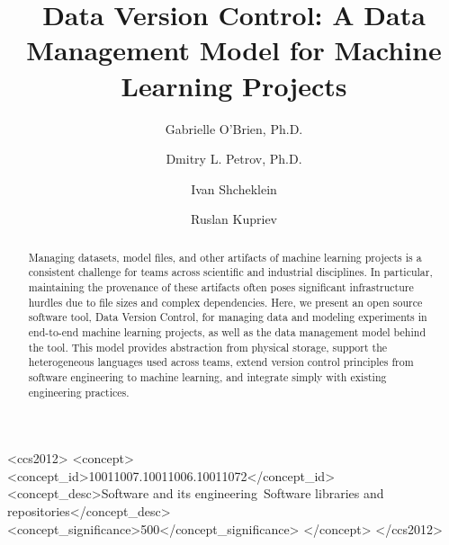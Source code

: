 \documentclass[10pt,sigconf, authordraft]{acmart}
\begin{document}
\title{Data Version Control: A Data Management Model for Machine Learning Projects}

\author{Gabrielle O'Brien, Ph.D.}

\author{Dmitry L. Petrov, Ph.D.}

\author{Ivan Shcheklein}

\author{Ruslan Kupriev}



\renewcommand{\shortauthors}{O'Brien et al.}

\begin{abstract}
    Managing datasets, model files, and other artifacts of machine learning projects is a consistent challenge for teams across scientific and industrial disciplines. In particular, maintaining the provenance of these artifacts often poses significant infrastructure hurdles due to file sizes and complex dependencies. Here, we present an open source software tool, Data Version Control, for managing data and modeling experiments in end-to-end machine learning projects, as well as the data management model behind the tool. This model provides abstraction from physical storage, support the heterogeneous languages used across teams, extend version control principles from software engineering to machine learning, and integrate simply with existing engineering practices. 
\end{abstract}

\begin{CCSXML}
<ccs2012>
<concept>
<concept_id>10011007.10011006.10011072</concept_id>
<concept_desc>Software and its engineering~Software libraries and repositories</concept_desc>
<concept_significance>500</concept_significance>
</concept>
</ccs2012>
\end{CCSXML}
\end{document}
